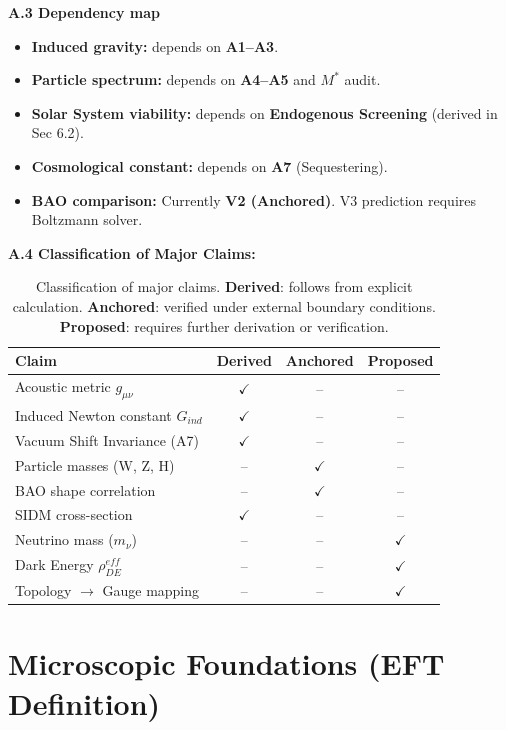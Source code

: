 \documentclass[a4paper,12pt]{article}
\begin{document}
\textbf{A.3 Dependency map}
\begin{itemize}
    \item \textbf{Induced gravity:} depends on \textbf{A1--A3}.
    \item \textbf{Particle spectrum:} depends on \textbf{A4--A5} and $M^*$ audit.
    \item \textbf{Solar System viability:} depends on \textbf{Endogenous Screening} (derived in Sec 6.2).
    \item \textbf{Cosmological constant:} depends on \textbf{A7} (Sequestering).
    \item \textbf{BAO comparison:} Currently \textbf{V2 (Anchored)}. V3 prediction requires Boltzmann solver.
\end{itemize}

\textbf{A.4 Classification of Major Claims:}
\begin{table}[H]
\centering
\small
\begin{tabular}{lccc}
\toprule
\textbf{Claim} & \textbf{Derived} & \textbf{Anchored} & \textbf{Proposed} \\
\midrule
Acoustic metric $g_{\mu\nu}$ & $\checkmark$ & -- & -- \\
Induced Newton constant $G_{ind}$ & $\checkmark$ & -- & -- \\
Vacuum Shift Invariance (A7) & $\checkmark$ & -- & -- \\
Particle masses (W, Z, H) & -- & $\checkmark$ & -- \\
BAO shape correlation & -- & $\checkmark$ & -- \\
SIDM cross-section & $\checkmark$ & -- & -- \\
Neutrino mass ($m_\nu$) & -- & -- & $\checkmark$ \\
Dark Energy $\rho_{DE}^{eff}$ & -- & -- & $\checkmark$ \\
Topology $\to$ Gauge mapping & -- & -- & $\checkmark$ \\
\bottomrule
\end{tabular}
\caption{Classification of major claims. \textbf{Derived}: follows from explicit calculation. \textbf{Anchored}: verified under external boundary conditions. \textbf{Proposed}: requires further derivation or verification.}
\end{table}

\section{Microscopic Foundations (EFT Definition)}
\end{document}
